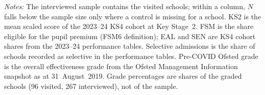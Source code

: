 \begin{table}[htbp]
\begin{tabular}{lrrrrrr}
    \bottomrule
  \end{tabular}
  \begin{minipage}{\linewidth}
    \vspace{2pt}
    \footnotesize
    \textit{Notes:} The interviewed sample contains the visited schools; within a column, $N$ falls below the sample size only where a control is missing for a school. KS2 is the mean scaled score of the 2023--24 KS4 cohort at Key Stage~2.
    FSM is the share eligible for the pupil premium (FSM6 definition); EAL and SEN are KS4
    cohort shares from the 2023--24 performance tables. Selective admissions is the share of
    schools recorded as selective in the performance tables. Pre-COVID Ofsted grade is the
    overall effectiveness grade from the Ofsted Management Information snapshot as at
    31~August~2019. Grade percentages are shares of the graded schools
    (96 visited, 267 interviewed), not of the sample.
  \end{minipage}
\end{table}
